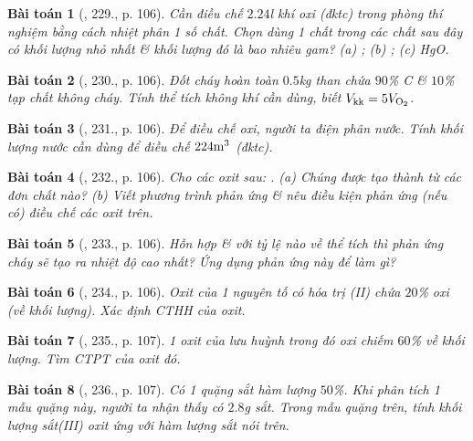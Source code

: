 \documentclass{article}
\newtheorem{baitoan}{Bài toán}
\begin{document}
\begin{baitoan}[\cite{An_400_BT_Hoa_Hoc_8_2020}, 229., p. 106]
	Cần điều chế $2.24$\emph{l} khí oxi (đktc) trong phòng thí nghiệm bằng cách nhiệt phân 1 số chất. Chọn dùng 1 chất trong các chất sau đây có khối lượng nhỏ nhất \& khối lượng đó là bao nhiêu gam? (a) \emph{}; (b) \emph{}; (c) \emph{HgO}.
\end{baitoan}

\begin{baitoan}[\cite{An_400_BT_Hoa_Hoc_8_2020}, 230., p. 106]
	Đốt cháy hoàn toàn $0.5$\emph{kg} than chứa $90$\% \emph{C} \& $10$\% tạp chất không cháy. Tính thể tích không khí cần dùng, biết $V_{\rm kk} = 5V_{\rm O_2}$.
\end{baitoan}

\begin{baitoan}[\cite{An_400_BT_Hoa_Hoc_8_2020}, 231., p. 106]
	Để điều chế oxi, người ta điện phân nước. Tính khối lượng nước cần dùng để điều chế $224{\rm m}^3$ \emph{} (đktc).
\end{baitoan}

\begin{baitoan}[\cite{An_400_BT_Hoa_Hoc_8_2020}, 232., p. 106]
	Cho các oxit sau: \emph{}. (a) Chúng được tạo thành từ các đơn chất nào? (b) Viết phương trình phản ứng \& nêu điều kiện phản ứng (nếu có) điều chế các oxit trên.
\end{baitoan}

\begin{baitoan}[\cite{An_400_BT_Hoa_Hoc_8_2020}, 233., p. 106]
	Hỗn hợp \emph{} \& \emph{} với tỷ lệ nào về thể tích thì phản ứng cháy sẽ tạo ra nhiệt độ cao nhất? Ứng dụng phản ứng này để làm gì?
\end{baitoan}

\begin{baitoan}[\cite{An_400_BT_Hoa_Hoc_8_2020}, 234., p. 106]
	Oxit của 1 nguyên tố có hóa trị (II) chứa $20$\% oxi (về khối lượng). Xác định CTHH của oxit.
\end{baitoan}

\begin{baitoan}[\cite{An_400_BT_Hoa_Hoc_8_2020}, 235., p. 107]
	1 oxit của lưu huỳnh trong đó oxi chiếm $60$\% về khối lượng. Tìm CTPT của oxit đó.
\end{baitoan}

\begin{baitoan}[\cite{An_400_BT_Hoa_Hoc_8_2020}, 236., p. 107]
	Có 1 quặng sắt hàm lượng $50$\%. Khi phân tích 1 mẫu quặng này, người ta nhận thấy có $2.8$\emph{g} sắt. Trong mẫu quặng trên, tính khối lượng sắt(III) oxit \emph{} ứng với hàm lượng sắt nói trên.
\end{baitoan}
\end{document}
